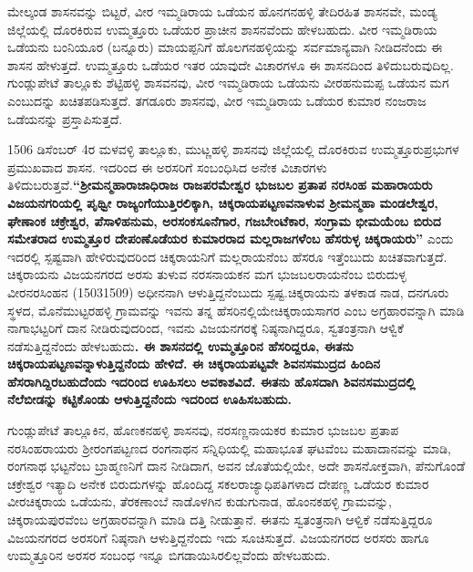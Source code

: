ಮೇಲ್ಕಂಡ ಶಾಸನವನ್ನು ಬಿಟ್ಟರೆ, ವೀರ ಇಮ್ಮಡಿರಾಯ ಒಡೆಯನ ಹೊನಗನಹಳ್ಳಿ ತೇದಿರಹಿತ ಶಾಸನವೇ, ಮಂಡ್ಯ ಜಿಲ್ಲೆಯಲ್ಲಿ ದೊರಕಿರುವ ಉಮ್ಮತ್ತೂರು ಒಡೆಯರ ಪ್ರಾಚೀನ ಶಾಸನವೆಂದು ಹೇಳಬಹುದು. ವೀರ ಇಮ್ಮಡಿರಾಯ ಒಡೆಯನು ಬಂನಿಯೂರ (ಬನ್ನೂರು) ಮಾಯಪ್ಪನಿಗೆ ಹೊಲಗನಹಳ್ಳಿಯನ್ನು ಸರ್ವಮಾನ್ಯವಾಗಿ ನೀಡಿದನೆಂದು ಈ ಶಾಸನ ಹೇಳುತ್ತದೆ. ಉಮ್ಮತ್ತೂರು ಒಡೆಯರ ಇತರ ಯಾವುದೇ ವಿಚಾರಗಳೂ ಈ ಶಾಸನದಿಂದ ತಿಳಿದುಬರುವುದಿಲ್ಲ. ಗುಂಡ್ಲುಪೇಟೆ ತಾಲ್ಲೂಕು ಶೆಟ್ಟಿಹಳ್ಳಿ ಶಾಸವನವು, ವೀರ ಇಮ್ಮಡಿರಾಯ ಒಡೆಯನು ವೀರಹನುಮಪ್ಪ ಒಡೆಯನ ಮಗ ಎಂಬುದನ್ನು ಖಚಿತಪಡಿಸುತ್ತದೆ. ತಗಡೂರು ಶಾಸನವು, ವೀರ ಇಮ್ಮಡಿರಾಯ ಒಡೆಯರ ಕುಮಾರ ನಂಜರಾಜ ಒಡೆಯನನ್ನು ಪ್ರಸ್ತಾಪಿಸುತ್ತದೆ.

1506 ಡಿಸೆಂಬರ್​ 4ರ ಮಳವಳ್ಳಿ ತಾಲ್ಲೂಕು, ಮುಟ್ಣಹಳ್ಳಿ ಶಾಸನವು ಜಿಲ್ಲೆಯಲ್ಲಿ ದೊರಕಿರುವ ಉಮ್ಮತ್ತೂರು\break ಪ್ರಭುಗಳ ಪ್ರಮುಖವಾದ ಶಾಸನ. ಇದರಿಂದ ಈ ಅರಸರಿಗೆ ಸಂಬಂಧಿಸಿದ ಅನೇಕ ವಿಚಾರಗಳು ತಿಳಿದುಬರುತ್ತವೆ.\break \textbf{“ಶ‍್ರೀಮನ್ಮಹಾರಾಜಾಧಿರಾಜ ರಾಜಪರಮೇಶ್ವರ ಭುಜಬಲ ಪ್ರತಾಪ ನರಸಿಂಹ ಮಹಾರಾಯರು ವಿಜಯನಗರಿಯಲ್ಲಿ ಪೃಥ್ವೀ ರಾಜ್ಯಂಗೆಯುತ್ತಿರಲಿಕ್ಕಾಗಿ, ಚಿಕ್ಕರಾಯಪಟ್ಟಣವನಾಳುವ ಶ‍್ರೀಮನ್ಮಹಾ ಮಂಡಲೇಶ್ವರ, ಘೇಣಾಂಕ ಚಕ್ರೇಶ್ವರ, ಪೆಸಾಳಿಹನುಮ, ಅರಸಂಕಸೂನೆಗಾರ, ಗಜಬೇಂಟೆಕಾರ, ಸಂಗ್ರಾಮ ಭೀಮಯೆಂಬ ಬಿರುದ ಸಮೇತರಾದ ಉಮ್ಮತ್ತೂರ ದೇಪಂಣೊಡೆಯರ ಕುಮಾರರಾದ ಮಲ್ಲರಾಜಗಳೆಂಬ ಹೆಸರುಳ್ಳ ಚಿಕ್ಕರಾಯರು” }ಎಂದು ಇದರಲ್ಲಿ ಸ್ಪಷ್ಟವಾಗಿ ಹೇಳಿರುವುದರಿಂದ ಚಿಕ್ಕರಾಯನಿಗೆ ಮಲ್ಲರಾಯನೆಂಬ ಹೆಸರೂ ಇತ್ತೆಂಬುದು ಖಚಿತವಾಗುತ್ತದೆ. ಚಿಕ್ಕರಾಯನು ವಿಜಯನಗರದ ಅರಸು ತುಳುವ ನರಸನಾಯಕನ ಮಗ ಭುಜಬಲರಾಯನೆಂಬ ಬಿರುದುಳ್ಳ ವೀರನರಸಿಂಹನ (15031509) ಅಧೀನನಾಗಿ ಆಳುತ್ತಿದ್ದನೆಂಬುದು ಸ್ಪಷ್ಟ.\break ಚಿಕ್ಕರಾಯನು ತಳಕಾಡ ನಾಡ, ದನಗೂರು ಸ್ಥಳದ, ಮೊನೆಮುಟ್ಟರಹಳ್ಳಿ ಗ್ರಾಮವನ್ನು ಇವನು ತನ್ನ ಹೆಸರಿನಲ್ಲಿಯೇ\break ಚಿಕ್ಕರಾಯಸಾಗರ ಎಂಬ ಅಗ್ರಹಾರವನ್ನಾಗಿ ಮಾಡಿ ನಾಗಾಭಟ್ಟರಿಗೆ ದಾನ ನೀಡಿರುವುದರಿಂದ, ಇವನು ವಿಜಯನಗರಕ್ಕೆ ನಿಷ್ಠನಾಗಿದ್ದರೂ, ಸ್ವತಂತ್ರನಾಗಿ ಆಳ್ವಿಕೆ ನಡೆಸುತ್ತಿದ್ದನೆಂದು ಹೇಳಬಹುದು\textbf{. ಈ ಶಾಸನದಲ್ಲಿ ಉಮ್ಮತ್ತೂರಿನ ಹೆಸರಿದ್ದರೂ, ಈತನು ಚಿಕ್ಕರಾಯಪಟ್ಟಣವನ್ನಾಳುತ್ತಿದ್ದನೆಂದು ಹೇಳಿದೆ. ಈ ಚಿಕ್ಕರಾಯಪಟ್ಟವೇ ಶಿವನಸಮುದ್ರದ ಹಿಂದಿನ ಹೆಸರಾಗಿದ್ದಿರಬಹುದೆಂದು ಇದರಿಂದ ಊಹಿಸಲು ಅವಕಾಶವಿದೆ. ಈತನು ಹೊಸದಾಗಿ ಶಿವನಸಮುದ್ರದಲ್ಲಿ ನೆಲೆಬೀಡನ್ನು ಕಟ್ಟಿಕೊಂಡು ಆಳುತ್ತಿದ್ದನೆಂದು ಇದರಿಂದ ಊಹಿಸಬಹುದು. }

ಗುಂಡ್ಲುಪೇಟೆ ತಾಲ್ಲೂಕಿನ, ಹೊಣಕನಹಳ್ಳಿ ಶಾಸನವು, ನರಸಣ್ಣನಾಯಕರ ಕುಮಾರ ಭುಜಬಲ ಪ್ರತಾಪ ನರಸಿಂಹರಾಯರು ಶ‍್ರೀರಂಗಪಟ್ಟಣದ ರಂಗನಾಥನ ಸನ್ನಿಧಿಯಲ್ಲಿ ಮಹಾಭೂತ ಘಟವೆಂಬ ಮಹಾದಾನವನ್ನು ಮಾಡಿ, ರಂಗನಾಥ ಭಟ್ಟನೆಂಬ ಬ್ರಾಹ್ಮಣನಿಗೆ ದಾನ ನೀಡಿದಾಗ, ಅವನ ಜೊತೆಯಲ್ಲಿಯೇ, ಅದೇ ಶಾಸನೋಕ್ತವಾಗಿ, ಪೆನುಗೊಂಡೆ ಚಕ್ರೇಶ್ವರ ಇತ್ಯಾದಿ ಅನೇಕ ಬಿರುದುಗಳನ್ನು ಹೊಂದಿದ್ದ ಸಕಲರಾಜ್ಯಾಧಿಪತಿಗಳಾದ ದೇಪಣ್ಣ ಒಡೆಯರ ಕುಮಾರ ವೀರಚಿಕ್ಕರಾಯ ಒಡೆಯನು, ತೆರಕಣಾಂಬೆ ನಾಡೊಳಗಿನ ಕುಡುಗುನಾಡ, ಹೊಂನಕಹಳ್ಳಿ ಗ್ರಾಮವನ್ನು, ಚಿಕ್ಕರಾಯಪುರವೆಂಬ ಅಗ್ರಹಾರವನ್ನಾಗಿ ಮಾಡಿ ದತ್ತಿ ನೀಡುತ್ತಾನೆ. ಈತನು ಸ್ವತಂತ್ರನಾಗಿ ಆಳ್ವಿಕೆ ನಡೆಸುತ್ತಿದ್ದರೂ ವಿಜಯನಗರದ ಅರಸರಿಗೆ ನಿಷ್ಠನಾಗಿ ಆಳುತ್ತಿದ್ದನೆಂದು ಇದು ಸೂಚಿಸುತ್ತದೆ. ವಿಜಯನಗರದ ಅರಸರು ಹಾಗೂ ಉಮ್ಮತ್ತೂರಿನ ಅರಸರ ಸಂಬಂಧ ಇನ್ನೂ ಬಿಗಡಾಯಿಸಿರಲಿಲ್ಲವೆಂದು ಹೇಳಬಹುದು. 

